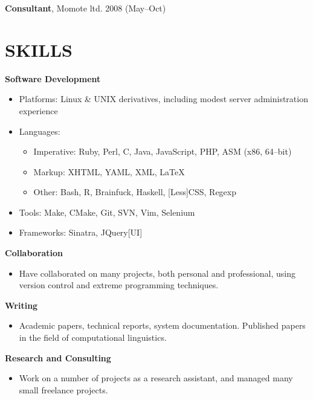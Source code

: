 \documentclass{res}
\begin{document}
\begin{resume}
    {\bf Consultant}, 
    Momote ltd.
    2008 (May--Oct)



 
\section{SKILLS} 
\vspace{0.1in}

   {\bf Software Development} 
        \begin{itemize}
            \item[] Platforms: Linux \& UNIX derivatives, including modest server administration experience
            \item[] Languages:
                \begin{itemize}
                    \item Imperative: Ruby, Perl, C, Java, JavaScript, PHP, ASM (x86, 64--bit)
                    \item Markup: XHTML, YAML, XML, \LaTeX
                    \item Other: Bash, R, Brainfuck, Haskell, [Less]CSS, Regexp
                \end{itemize}
            \item[] Tools: Make, CMake, Git, SVN, Vim, Selenium
            \item[] Frameworks: Sinatra, JQuery[UI]
        \end{itemize}

  {\bf Collaboration}
    \begin{itemize}
      \item[] Have collaborated on many projects, both personal and professional, using
          version control and extreme programming techniques.
      \end{itemize}

  {\bf Writing}
    \begin{itemize} %
      \item[] Academic papers, technical reports, system documentation.
        Published papers in the field of computational linguistics.
      \end{itemize}


   {\bf  Research and Consulting} 
        \begin{itemize}
        \item[] Work on a number of projects as a research assistant, and managed many small freelance projects.
       \end{itemize} 
 



\end{resume}
\end{document}
